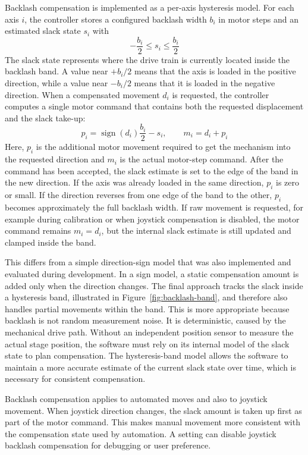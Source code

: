 Backlash compensation is implemented as a per-axis hysteresis model. For each axis $i$, the controller stores a configured backlash width $b_i$ in motor steps and an estimated slack state $s_i$ with
\[
    -\frac{b_i}{2} \leq s_i \leq \frac{b_i}{2}
\]
The slack state represents where the drive train is currently located inside the backlash band. A value near $+b_i/2$ means that the axis is loaded in the positive direction, while a value near $-b_i/2$ means that it is loaded in the negative direction. When a compensated movement $d_i$ is requested, the controller computes a single motor command that contains both the requested displacement and the slack take-up:
\[
    p_i = \operatorname{sign}(d_i)\frac{b_i}{2} - s_i,
    \qquad
    m_i = d_i + p_i
\]
Here, $p_i$ is the additional motor movement required to get the mechanism into the requested direction and $m_i$ is the actual motor-step command. After the command has been accepted, the slack estimate is set to the edge of the band in the new direction. If the axis was already loaded in the same direction, $p_i$ is zero or small. If the direction reverses from one edge of the band to the other, $p_i$ becomes approximately the full backlash width. If raw movement is requested, for example during calibration or when joystick compensation is disabled, the motor command remains $m_i=d_i$, but the internal slack estimate is still updated and clamped inside the band.



This differs from a simple direction-sign model that was also implemented and evaluated during development. In a sign model, a static compensation amount is added only when the direction changes. The final approach tracks the slack inside a hysteresis band, illustrated in Figure~\ref{fig:backlash-band}, and therefore also handles partial movements within the band. This is more appropriate because backlash is not random measurement noise. It is deterministic, caused by the mechanical drive path. Without an independent position sensor to measure the actual stage position, the software must rely on its internal model of the slack state to plan compensation. The hysteresis-band model allows the software to maintain a more accurate estimate of the current slack state over time, which is necessary for consistent compensation.

Backlash compensation applies to automated moves and also to joystick movement. When joystick direction changes, the slack amount is taken up first as part of the motor command. This makes manual movement more consistent with the compensation state used by automation. A setting can disable joystick backlash compensation for debugging or user preference.

